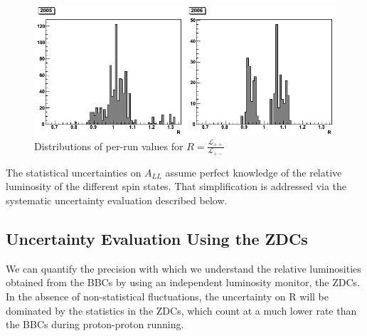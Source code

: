 




\begin{figure}
  \includegraphics[width=1.0\textwidth]{figures/relative_luminosities}
  \caption{Distributions of per-run values for $R = \frac{\mathcal{L}_{++}}{\mathcal{L}_{+-}}$}
\end{figure}

The statistical uncertainties on $A_{LL}$ assume perfect knowledge of the
relative luminosity of the different spin states. That simplification is
addressed via the systematic uncertainty evaluation described below.

\subsection{Uncertainty Evaluation Using the ZDCs}


We can quantify the precision with which we understand the relative luminosities
obtained from the BBCs by using an independent luminosity monitor, the ZDCs. In
the absence of non-statistical fluctuations, the uncertainty on R will be
dominated by the statistics in the ZDCs, which count at a much lower rate than
the BBCs during proton-proton running.

